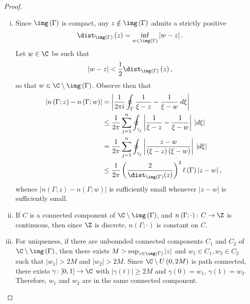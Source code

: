 \documentclass[10pt]{mypackage}
\begin{document}
\begin{proof}\hfill
  \begin{enumerate}[(i)]
    \item Since $ \img\left( \Gamma \right) $ is compact, any $z\notin \img\left( \Gamma \right)$ admits a strictly positive
      \begin{align*}
        \dist_{\img\left( \Gamma \right)}\left( z \right) &= \inf_{w\in\img\left( \Gamma \right)} \left\vert w-z \right\vert.
      \end{align*}
      Let $w\in\C$ be such that
      \begin{align*}
        \left\vert w-z \right\vert &< \frac{1}{2}\dist_{\img\left( \Gamma \right)}\left( z \right),
      \end{align*}
      so that $w\in \C\setminus \img\left( \Gamma \right)$. Observe then that
      \begin{align*}
        \left\vert n\left( \Gamma;z \right)-n\left( \Gamma;w \right) \right\vert &= \left\vert \frac{1}{2\pi i} \oint_{\Gamma}^{} \frac{1}{\xi-z} - \frac{1}{\xi-w}\:d\xi \right\vert\\
                                                                                 &\leq \frac{1}{2\pi} \sum_{j=1}^{n} \oint_{\gamma_j}^{} \left\vert \frac{1}{\xi-z} - \frac{1}{\xi-w} \right\vert \:\left\vert d\xi \right\vert\\
                                                                                 &= \frac{1}{2\pi} \sum_{j=1}^{n} \oint_{\gamma_j}^{} \left\vert \frac{z-w}{\left( \xi-z \right)\left( \xi-w \right)} \right\vert\:\left\vert d\xi \right\vert\\
                                                                                 &\leq \frac{1}{2\pi} \left( \frac{2}{\dist_{\img\left( \Gamma \right)}(z)} \right)^2 \ell\left( \Gamma \right)\left\vert z-w \right\vert,
      \end{align*}
      whence $\left\vert n\left( \Gamma;z \right)-n\left( \Gamma;w \right) \right\vert$ is sufficiently small whenever $\left\vert z-w \right\vert$ is sufficiently small.
    \item If $C$ is a connected component of $\C\setminus\img\left( \Gamma \right)$, and $n\left( \Gamma;\cdot \right)\colon C\rightarrow \Z$ is continuous, then since $\Z$ is discrete, $n\left( \Gamma;\cdot \right)$ is constant on $C$.
    \item For uniqueness, if there are unbounded connected components $C_1$ and $C_2$ of $\C\setminus \img\left( \Gamma \right)$, then there exists $M > \sup_{z\in\img\left( \Gamma \right)}\left\vert z \right\vert$ and $w_1\in C_1,w_2\in C_2$ such that $\left\vert w_1 \right\vert > 2M$ and $\left\vert w_2 \right\vert > 2M$. Since $\C\setminus U\left( 0,2M \right)$ is path connected, there exists $\gamma\colon [0,1]\rightarrow \C$ with $\left\vert \gamma(t) \right\vert \geq 2M$ and $\gamma(0) = w_1$, $\gamma(1) = w_2$. Therefore, $w_1$ and $w_2$ are in the same connected component.\newline


\end{enumerate}
\end{proof}
\end{document}
